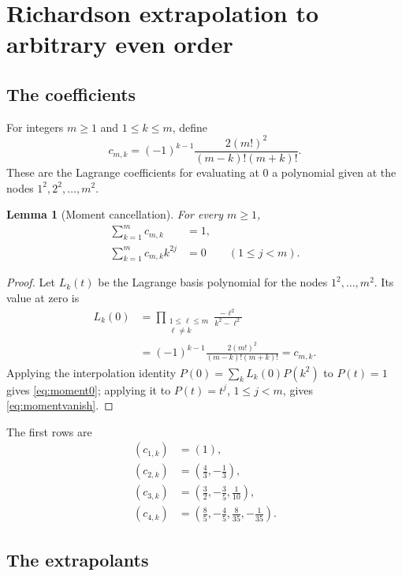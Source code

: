 \documentclass[11pt,oneside]{article}
\newtheorem{lemma}[theorem]{Lemma}
\theoremstyle{definition}
\theoremstyle{remark}
\begin{document}
\section{Richardson extrapolation to arbitrary even order}
\label{sec:richardson}

\subsection{The coefficients}

For integers $m\ge1$ and $1\le k\le m$, define
\begin{equation}
 c_{m,k}=(-1)^{k-1}\frac{2(m!)^2}{(m-k)!(m+k)!}.
 \label{eq:cmk}
\end{equation}
These are the Lagrange coefficients for evaluating at $0$ a polynomial given at the nodes
$1^2,2^2,\dots,m^2$.

\begin{lemma}[Moment cancellation]
\label{lem:momentcancellation}
For every $m\ge1$,
\begin{align}
 \sum_{k=1}^m c_{m,k}&=1,
 \label{eq:moment0}\\
 \sum_{k=1}^m c_{m,k}k^{2j}&=0
 \qquad(1\le j<m).
 \label{eq:momentvanish}
\end{align}
\end{lemma}

\begin{proof}
Let $L_k(t)$ be the Lagrange basis polynomial for the nodes $1^2,\dots,m^2$.  Its value at zero
is
\begin{align*}
 L_k(0)
 &=\prod_{\substack{1\le\ell\le m\\\ell\ne k}}
   \frac{-\ell^2}{k^2-\ell^2}\\
 &=(-1)^{k-1}\frac{2(m!)^2}{(m-k)!(m+k)!}
 =c_{m,k}.
\end{align*}
Applying the interpolation identity $P(0)=\sum_kL_k(0)P(k^2)$ to $P(t)=1$ gives
\eqref{eq:moment0}; applying it to $P(t)=t^j$, $1\le j<m$, gives
\eqref{eq:momentvanish}.
\end{proof}

The first rows are
\begin{align*}
 (c_{1,k})&=(1),\\
 (c_{2,k})&=\left(\frac43,-\frac13\right),\\
 (c_{3,k})&=\left(\frac32,-\frac35,\frac1{10}\right),\\
 (c_{4,k})&=\left(\frac85,-\frac45,\frac8{35},-\frac1{35}\right).
\end{align*}

\subsection{The extrapolants}
\end{document}
